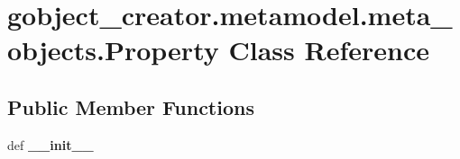 \hypertarget{classgobject__creator_1_1metamodel_1_1meta__objects_1_1Property}{
\section{gobject\_\-creator.metamodel.meta\_\-objects.Property Class Reference}
\label{classgobject__creator_1_1metamodel_1_1meta__objects_1_1Property}
}
\subsection*{Public Member Functions}
\begin{DoxyCompactItemize}
\item 
\hypertarget{classgobject__creator_1_1metamodel_1_1meta__objects_1_1Property_acc4425841087c2e2192597caec71e905}{
def {\bfseries \_\-\_\-init\_\-\_\-}}
\label{classgobject__creator_1_1metamodel_1_1meta__objects_1_1Property_acc4425841087c2e2192597caec71e905}

\end{DoxyCompactItemize}
